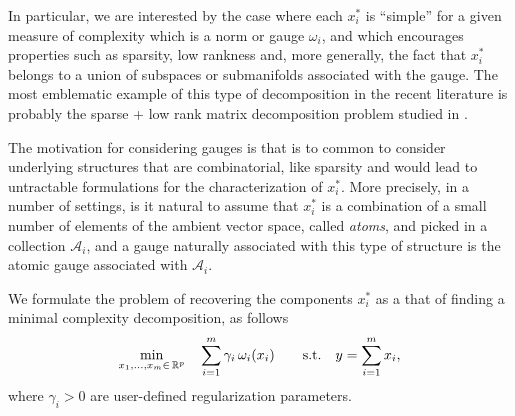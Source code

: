 \documentclass{article}
\begin{document}
In particular, we are interested by the case where each $x_{i}^*$ is ``simple'' for a given measure of complexity which is a norm or gauge $\omega_i$, and which encourages properties such as sparsity, low rankness and, more generally, the fact that $x_{i}^*$ belongs to a union of subspaces or submanifolds associated with the gauge. The most emblematic example of this type of decomposition in the recent literature is probably the sparse + low rank matrix decomposition problem studied in \citet{chandrasekaran2011rank}. 

The motivation for considering gauges is that is to common to consider underlying structures that are combinatorial, like sparsity and would lead to untractable formulations for the characterization of $x_i^*$. More precisely, in a number of settings, is it natural to assume that $x_i^*$ is a combination of a small number of elements of the ambient vector space, called \emph{atoms}, and picked in a collection $\mathcal{A}_i$, and a gauge naturally associated with this type of structure
is the atomic gauge  associated with $\mathcal{A}_i$.

We formulate the problem of recovering the components $x_i^*$ as a that of finding a minimal complexity decomposition, as follows
\begin{equation}
\label{eq:gen_opt}
\min_{x_{1}, \ldots, x_{m} \in \,\mathbb{R}^p} \quad \sum_{i=1}^{m} \gamma_{i}\, \omega_{i}(x_{i})
\qquad \text{s.t.} \quad y=\sum_{i=1}^{m}x_{i},
\end{equation}
where $\gamma_{i}>0$ are  user-defined regularization parameters. 
\end{document}
